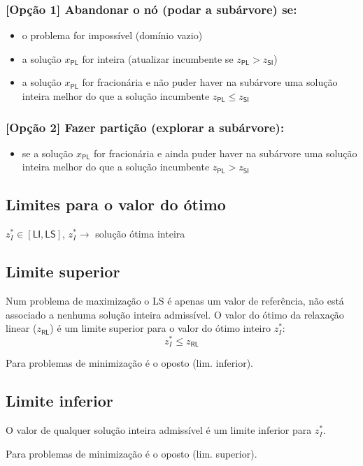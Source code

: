 \documentclass[10pt, a4paper]{article}
\begin{document}
\begin{multicols}{2}
\subsubsection{[Opção 1] Abandonar o nó (podar a subárvore) se:}

\begin{itemize}
    \item o problema for impossível (domínio vazio)
    \item a solução \(x_\textsf{PL}\) for inteira (atualizar incumbente se \(z_\textsf{PL} > z_\textsf{SI}\))
    \item a solução \(x_\textsf{PL}\) for fracionária e não puder haver na subárvore uma solução inteira melhor do que a solução incumbente \(z_\textsf{PL} \le z_\textsf{SI}\)
\end{itemize}

\subsubsection{[Opção 2] Fazer partição (explorar a subárvore):}

\begin{itemize}
    \item se a solução \(x_\textsf{PL}\) for fracionária e ainda puder haver na subárvore uma solução inteira melhor do que a solução incumbente \(z_\textsf{PL} > z_\textsf{SI}\)
\end{itemize}

\subsection{Limites para o valor do ótimo}

\(z_I^* \in [\textsf{LI}, \textsf{LS}]\), \(z_I^* \rightarrow\) solução ótima inteira

\subsection{Limite superior}

Num problema de maximização o LS é apenas um valor de referência, não está associado a nenhuma solução inteira admissível. O valor do ótimo da relaxação linear (\(z_\textsf{RL}\)) é um limite superior para o valor do ótimo inteiro \(z_I^*\):
\[z_I^* \le z_\textsf{RL}\]

\vspace{0.25cm}

Para problemas de minimização é o oposto (lim. inferior).

\subsection{Limite inferior}

O valor de qualquer solução inteira admissível é um limite inferior para \(z_I^*\). 

Para problemas de minimização é o oposto (lim. superior).

\end{multicols}
\end{document}
